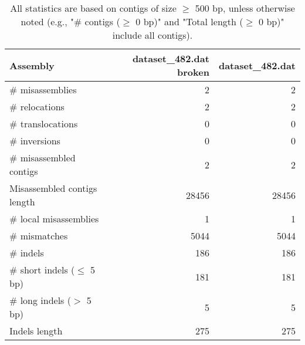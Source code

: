 \documentclass[12pt,a4paper]{article}
\begin{document}
\begin{table}[ht]
\begin{center}
\caption{All statistics are based on contigs of size $\geq$ 500 bp, unless otherwise noted (e.g., "\# contigs ($\geq$ 0 bp)" and "Total length ($\geq$ 0 bp)" include all contigs).}
\begin{tabular}{|l*{2}{|r}|}
\hline
Assembly & dataset\_482.dat broken & dataset\_482.dat \\ \hline
\# misassemblies & 2 & 2 \\ \hline
\hspace{5mm}\# relocations & 2 & 2 \\ \hline
\hspace{5mm}\# translocations & 0 & 0 \\ \hline
\hspace{5mm}\# inversions & 0 & 0 \\ \hline
\# misassembled contigs & 2 & 2 \\ \hline
Misassembled contigs length & 28456 & 28456 \\ \hline
\# local misassemblies & 1 & 1 \\ \hline
\# mismatches & 5044 & 5044 \\ \hline
\# indels & 186 & 186 \\ \hline
\hspace{5mm}\# short indels ($\leq$ 5 bp) & 181 & 181 \\ \hline
\hspace{5mm}\# long indels ($>$ 5 bp) & 5 & 5 \\ \hline
Indels length & 275 & 275 \\ \hline
\end{tabular}
\end{center}
\end{table}
\end{document}
